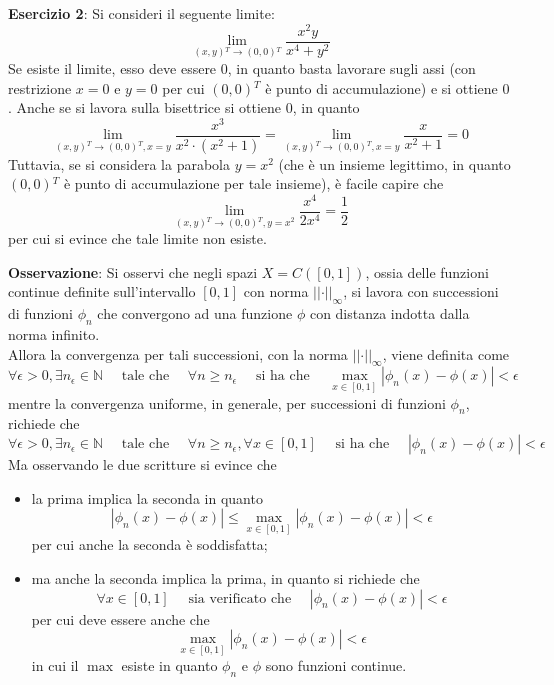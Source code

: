 \documentclass[a4paper]{extarticle}
\begin{document}
\vspace{1em}
\noindent
\textbf{Esercizio 2}: Si consideri il seguente limite:
\[\lim_{(x,y){^T} \to (0,0){^T}} \frac{x^2y}{x^4+y^2}\]
Se esiste il limite, esso deve essere $0$, in quanto basta lavorare sugli assi (con restrizione $x=0$ e $y=0$ per cui $(0,0){^T}$ è punto di accumulazione) e si ottiene $0$. Anche se si lavora sulla bisettrice si ottiene $0$, in quanto
\[\lim_{(x,y){^T} \to (0,0){^T},x=y} \frac{x^3}{x^2 \cdot (x^2+1)} = \lim_{(x,y){^T} \to (0,0){^T},x=y} \dfrac{x}{x^2+1}=0\]
Tuttavia, se si considera la parabola $y=x^2$ (che è un insieme legittimo, in quanto $(0,0){^T}$ è punto di accumulazione per tale insieme), è facile capire che
\[\lim_{(x,y){^T} \to (0,0){^T},y=x^2} \frac{x^4}{2x^4}=\frac{1}{2}\]
per cui si evince che tale limite non esiste.

\vspace{1em}
\noindent
\textbf{Osservazione}: Si osservi che negli spazi $X=C([0,1])$, ossia delle funzioni continue definite sull'intervallo $[0,1]$ con norma $\vert \vert \cdot \vert \vert_\infty$, si lavora con successioni di funzioni $\phi_n$ che convergono ad una funzione $\phi$ con distanza indotta dalla norma infinito.\\
Allora la convergenza per tali successioni, con la norma $\vert \vert \cdot \vert \vert_\infty$, viene definita come
\[\forall \epsilon > 0, \exists n_\epsilon \in \mathbb{N} \hspace{1em} \text{ tale che } \hspace{1em} \forall n \geq n_\epsilon \hspace{1em} \text{ si ha che } \hspace{1em} \underset{x \in [0,1]}{\max} \left \vert \phi_n(x) - \phi(x) \right \vert < \epsilon\]
mentre la convergenza uniforme, in generale, per successioni di funzioni $\phi_n$, richiede che
\[\forall \epsilon > 0, \exists n_\epsilon \in \mathbb{N} \hspace{1em} \text{ tale che } \hspace{1em} \forall n \geq n_\epsilon, \forall x \in [0,1] \hspace{1em} \text{ si ha che } \hspace{1em} \left \vert \phi_n(x) - \phi(x) \right \vert < \epsilon\]
Ma osservando le due scritture si evince che
\begin{itemize}
    \item la prima implica la seconda in quanto
    \[\left \vert \phi_n(x) - \phi(x) \right \vert \leq \underset{x \in [0,1]}{\max} \left \vert \phi_n(x) - \phi(x) \right \vert < \epsilon\]
    per cui anche la seconda è soddisfatta;
    \item ma anche la seconda implica la prima, in quanto si richiede che
    \[\forall x \in [0,1] \hspace{1em} \text{ sia verificato che } \hspace{1em} \left \vert \phi_n(x) - \phi(x) \right \vert < \epsilon\]
    per cui deve essere anche che
    \[\underset{x \in [0,1]}{\max} \left \vert \phi_n(x) - \phi(x) \right \vert < \epsilon\]
    in cui il ${\max}$ esiste in quanto $\phi_n$ e $\phi$ sono funzioni continue.
\end{itemize}
\end{document}
